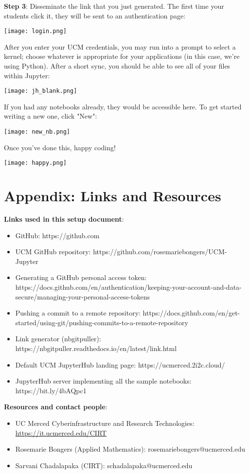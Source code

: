 \documentclass{amsart}
\begin{document}
\newpage

\textbf{Step 3}: Disseminate the link that you just generated. The first time your students click it, they will be sent to an authentication page:
\begin{center}
\texttt{[image: login.png]}
\end{center}
After you enter your UCM credentials, you may run into a prompt to select a kernel; choose whatever is appropriate for your applications (in this case, we're using Python). After a short sync, you should be able to see all of your files within Jupyter:
\begin{center}
\texttt{[image: jh\_blank.png]}
\end{center}
If you had any notebooks already, they would be accessible here. To get started writing a new one, click "New":
\begin{center}
\texttt{[image: new\_nb.png]}
\end{center}
Once you've done this, happy coding!
\begin{center}
\texttt{[image: happy.png]}
\end{center}

\newpage

\section*{Appendix: Links and Resources}

\textbf{Links used in this setup document}:
\begin{itemize}
\item GitHub: https://github.com
\item UCM GitHub repository: https://github.com/rosemariebongers/UCM-Jupyter
\item Generating a GitHub personal access token: https://docs.github.com/en/authentication/keeping-your-account-and-data-secure/managing-your-personal-access-tokens
\item Pushing a commit to a remote repository: https://docs.github.com/en/get-started/using-git/pushing-commits-to-a-remote-repository
\item Link generator (nbgitpuller): https://nbgitpuller.readthedocs.io/en/latest/link.html
\item Default UCM JupyterHub landing page: https://ucmerced.2i2c.cloud/
\item JupyterHub server implementing all the sample notebooks: https://bit.ly/4bAQpc1
\end{itemize}

\vspace{.5in}

\textbf{Resources and contact people}:
\begin{itemize}
\item UC Merced Cyberinfrastructure and Research Technologies: \href{https://it.ucmerced.edu/CIRT}{https://it.ucmerced.edu/CIRT}
\item Rosemarie Bongers (Applied Mathematics): rosemariebongers@ucmerced.edu
\item Sarvani Chadalapaka (CIRT): schadalapaka@ucmerced.edu
\end{itemize}
\end{document}
